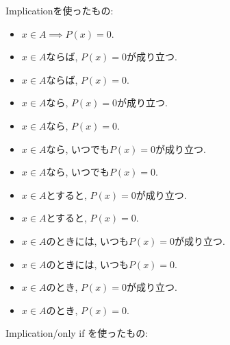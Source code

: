 \documentclass[a4paper,12pt,draft]{amsart}
\newcommand{\PPP}[1]{P(#1)=0}
\begin{document}
Implicationを使ったもの:
\begin{itemize}
\item $x \in A\implies \PPP{x}$.
\item $x\in A$ならば, $\PPP{x}$が成り立つ.
\item $x\in A$ならば, $\PPP{x}$.
\item $x\in A$なら, $\PPP{x}$が成り立つ.
\item $x\in A$なら, $\PPP{x}$.
\item $x\in A$なら, いつでも$\PPP{x}$が成り立つ.
\item $x\in A$なら, いつでも$\PPP{x}$.
\item $x\in A$とすると, $\PPP{x}$が成り立つ.
\item $x\in A$とすると, $\PPP{x}$.
\item $x\in A$のときには, いつも$\PPP{x}$が成り立つ.
\item $x\in A$のときには, いつも$\PPP{x}$.
\item $x\in A$のとき, $\PPP{x}$が成り立つ.
\item $x\in A$のとき, $\PPP{x}$.
\end{itemize}
Implication/only if を使ったもの:
\end{document}
